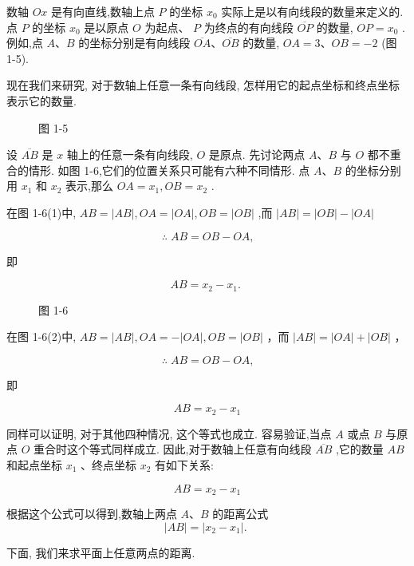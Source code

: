 \documentclass[lang=cn,newtx,12pt,scheme=chinese]{elegantbook}
\begin{document}
数轴 \({Ox}\) 是有向直线,数轴上点 \(P\) 的坐标 \({x}_{0}\) 实际上是以有向线段的数量来定义的. 点 \(P\) 的坐标 \({x}_{0}\) 是以原点 \(O\) 为起点、 \(P\) 为终点的有向线段 \(\overline{OP}\) 的数量, \({OP} = {x}_{0}\) . 例如,点 \(A\text{、}B\) 的坐标分别是有向线段 \(\overline{OA}\text{、}\overline{OB}\) 的数量, \({OA} = 3\text{、}{OB} = - 2\) (图 1-5).

现在我们来研究, 对于数轴上任意一条有向线段, 怎样用它的起点坐标和终点坐标表示它的数量.

\begin{figure}[h]
  \centering
  
  \caption{图 1-5}
\end{figure}

设 \(\overline{AB}\) 是 \(x\) 轴上的任意一条有向线段, \(O\) 是原点. 先讨论两点 \(A\text{、}B\) 与 \(O\) 都不重合的情形. 如图 1-6,它们的位置关系只可能有六种不同情形. 点 \(A\text{、}B\) 的坐标分别用 \({x}_{1}\) 和 \({x}_{2}\) 表示,那么 \({OA} = {x}_{1},{OB} = {x}_{2}\) .

在图 1-6(1)中, \({AB} = \left| {AB}\right| ,{OA} = \left| {OA}\right| ,{OB} = \left| {OB}\right|\) ,而 \(\left| {AB}\right| = \left| {OB}\right| - \left| {OA}\right|\)

\[
  \therefore \;{AB} = {OB} - {OA}\text{,}
\]

即

\[
    {AB} = {x}_{2} - {x}_{1}\text{. }
\]

\begin{figure}[h]
  \centering
  
  \caption{图 1-6}
\end{figure}

在图 1-6(2)中, \({AB} = \left| {AB}\right| ,{OA} = - \left| {OA}\right| ,{OB} = \left| {OB}\right|\) ，而 \(\left| {AB}\right| = \left| {OA}\right| + \left| {OB}\right|\) ，

\[
  \therefore \;{AB} = {OB} - {OA}\text{,}
\]

即

\[
    {AB} = {x}_{2} - {x}_{1}
\]

同样可以证明, 对于其他四种情况, 这个等式也成立. 容易验证,当点 \(A\) 或点 \(B\) 与原点 \(O\) 重合时这个等式同样成立. 因此,对于数轴上任意有向线段 \(\overline{AB}\) ,它的数量 \({AB}\) 和起点坐标 \({x}_{1}\) 、终点坐标 \({x}_{2}\) 有如下关系:

\[
    {AB} = {x}_{2} - {x}_{1}
\]
\begin{corollary}[数轴两点的距离公式]
根据这个公式可以得到,数轴上两点 \(A\text{、}B\) 的距离公式
\[
  \left| {AB}\right| = \left| {{x}_{2} - {x}_{1}}\right| \text{. }
\]
\end{corollary}
下面, 我们来求平面上任意两点的距离.
\end{document}
